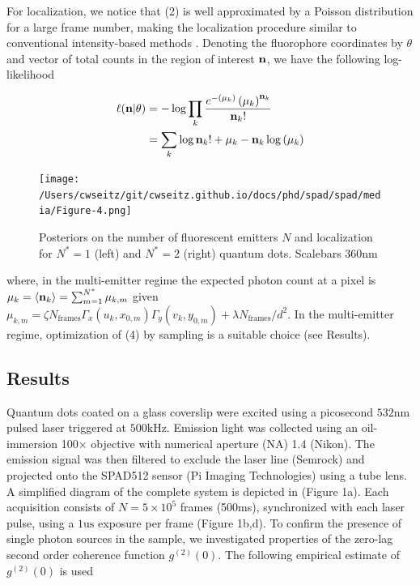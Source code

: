For localization, we notice that (2) is well approximated by a Poisson distribution for a large frame number, making the localization procedure similar to conventional intensity-based methods \parencite{Smith2010}. Denoting the fluorophore coordinates by $\theta$ and vector of total counts in the region of interest $\bold{n}$, we have the following log-likelihood


\begin{align}
\ell(\bold{n}\lvert \theta) &= -\log \prod_{k} \frac{e^{-\left(\mu_{k}\right)}\left(\mu_{k}\right)^{\bold{n}_k}}{\bold{n}_k!}\\
&= \sum_{k}  \log \bold{n}_k! + \mu_{k} - \bold{n}_k\log\left(\mu_{k}\right)
\end{align}

\begin{figure}[t]
\centering
\texttt{[image: /Users/cwseitz/git/cwseitz.github.io/docs/phd/spad/spad/media/Figure-4.png]}
\caption{Posteriors on the number of fluorescent emitters $N$ and localization for $N^{*}=1$ (left) and $N^{*}=2$ (right) quantum dots. Scalebars 360nm}
\end{figure}   

where, in the multi-emitter regime the expected photon count at a pixel is $\mu_{k} = \langle \bold{n}_k\rangle =\sum_{m=1}^{N^{*}} \mu_{k,m}$ given $\mu_{k,m}=\zeta N_{\mathrm{frames}}\Gamma_{x}(u_k,x_{0,m})\Gamma_{y}(v_k,y_{0,m}) + \lambda N_{\mathrm{frames}}/d^{2}$. In the multi-emitter regime, optimization of (4) by sampling is a suitable choice (see Results). 


\subsection{Results}

Quantum dots coated on a glass coverslip were excited using a picosecond $532\mathrm{nm}$ pulsed laser triggered at $500\mathrm{kHz}$. Emission light was collected using an oil-immersion 100$\times$ objective with numerical aperture (NA) 1.4 (Nikon). The emission signal was then filtered to exclude the laser line (Semrock) and projected onto the SPAD512 sensor (Pi Imaging Technologies) using a tube lens. A simplified diagram of the complete system is depicted in (Figure 1a). Each acquisition consists of $N=5\times 10^{5}$ frames (500ms), synchronized with each laser pulse, using a $1\mathrm{us}$ exposure per frame (Figure 1b,d). To confirm the presence of single photon sources in the sample, we investigated properties of the zero-lag second order coherence function $g^{(2)}(0)$. The following empirical estimate of $g^{(2)}(0)$ is used \parencite{Israel2017}

